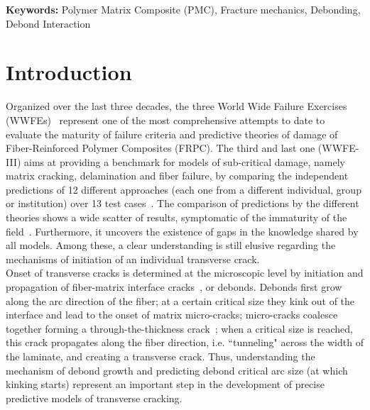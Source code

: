\vspace{5mm}

\textbf{Keywords:} Polymer Matrix Composite (PMC), Fracture mechanics, Debonding, Debond Interaction



\section{Introduction}

Organized over the last three decades, the three World Wide Failure Exercises (WWFEs)~\cite{Hinton2004,Hinton2012,Kaddour2013a} represent one of the most comprehensive attempts to date to evaluate the maturity of failure criteria and predictive theories of damage of Fiber-Reinforced Polymer Composites (FRPC). The third and last one (WWFE-III) aims at providing a benchmark for models of sub-critical damage, namely matrix cracking, delamination and fiber failure, by comparing the independent predictions of 12 different approaches (each one from a different individual, group or institution) over 13 test cases~\cite{Kaddour2013a}. The comparison of predictions by the different theories shows a wide scatter of results, symptomatic of the immaturity of the field~\cite{Kaddour2013b}. Furthermore, it uncovers the existence of gaps in the knowledge shared by all models. Among these, a clear understanding is still elusive regarding the mechanisms of initiation of an individual transverse crack.\\
Onset of transverse cracks is determined at the microscopic level by initiation and propagation of fiber-matrix interface cracks~\cite{Bailey1981,Bailey1979}, or debonds. Debonds first grow along the arc direction of the fiber; at a certain critical size they kink out of the interface and lead to the onset of matrix micro-cracks; micro-cracks coalesce together forming a through-the-thickness crack~\cite{Zhang1997}; when a critical size is reached, this crack propagates along the fiber direction, i.e. ``tunneling" across the width of the laminate, and creating a transverse crack. Thus, understanding the mechanism of debond growth and predicting debond critical arc size (at which kinking starts) represent an important step in the development of precise predictive models of transverse cracking.

